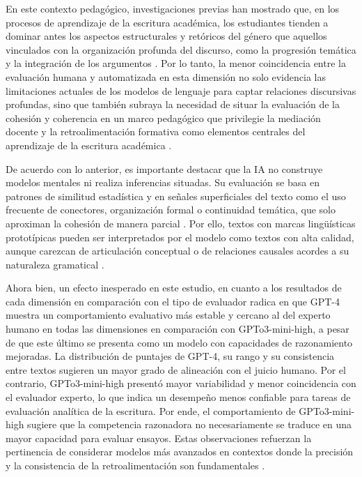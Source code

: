 \documentclass[spanish]{textolivre}
\begin{document}
En este contexto pedagógico, investigaciones previas han mostrado que, en los procesos de aprendizaje de la escritura académica, los estudiantes tienden a dominar antes los aspectos estructurales y retóricos del género que aquellos vinculados con la organización profunda del discurso, como la progresión temática y la integración de los argumentos \cite{castello2011, tardy2020}. Por lo tanto, la menor coincidencia entre la evaluación humana y automatizada en esta dimensión no solo evidencia las limitaciones actuales de los modelos de lenguaje para captar relaciones discursivas profundas, sino que también subraya la necesidad de situar la evaluación de la cohesión y coherencia en un marco pedagógico que privilegie la mediación docente y la retroalimentación formativa como elementos centrales del aprendizaje de la escritura académica \cite{carless2020, sologuren2023}.

De acuerdo con lo anterior, es importante destacar que la IA no construye modelos mentales ni realiza inferencias situadas. Su evaluación se basa en patrones de similitud estadística y en señales superficiales del texto como el uso frecuente de conectores, organización formal o continuidad temática, que solo aproximan la cohesión de manera parcial \cite{garciafernandez2025}. Por ello, textos con marcas lingüísticas prototípicas pueden ser interpretados por el modelo como textos con alta calidad, aunque carezcan de articulación conceptual o de relaciones causales acordes a su naturaleza gramatical \cite{kloss2023}.

Ahora bien, un efecto inesperado en este estudio, en cuanto a los resultados de cada dimensión en comparación con el tipo de evaluador radica en que GPT-4 muestra un comportamiento evaluativo más estable y cercano al del experto humano en todas las dimensiones en comparación con GPTo3-mini-high, a pesar de que este último se presenta como un modelo con capacidades de razonamiento mejoradas. La distribución de puntajes de GPT-4, su rango y su consistencia entre textos sugieren un mayor grado de alineación con el juicio humano. Por el contrario, GPTo3-mini-high presentó mayor variabilidad y menor coincidencia con el evaluador experto, lo que indica un desempeño menos confiable para tareas de evaluación analítica de la escritura. Por ende, el comportamiento de GPTo3-mini-high sugiere que la competencia razonadora no necesariamente se traduce en una mayor capacidad para evaluar ensayos. Estas observaciones refuerzan la pertinencia de considerar modelos más avanzados en contextos donde la precisión y la consistencia de la retroalimentación son fundamentales \cite{poole2024, cordovezfernandez2024}.
\end{document}
